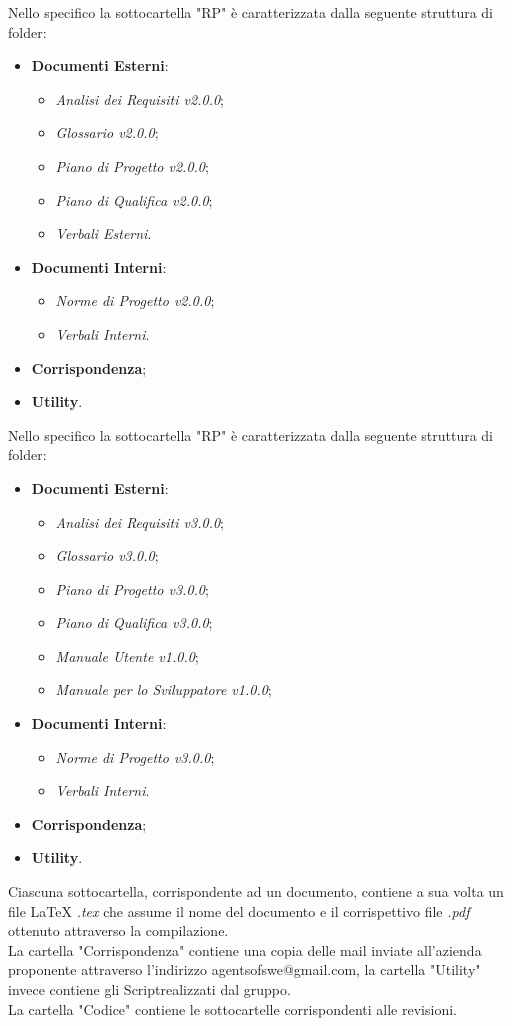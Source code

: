 	Nello specifico la sottocartella "RP" è caratterizzata dalla seguente struttura di folder:
	\begin{itemize}
	\item \textbf{Documenti Esterni}:
		\begin{itemize}
		\item \textit{Analisi dei Requisiti v2.0.0};
		\item \textit{Glossario v2.0.0};
		\item \textit{Piano di Progetto v2.0.0};
		\item \textit{Piano di Qualifica v2.0.0};
		\item \textit{Verbali Esterni}.
		\end{itemize}
	\item \textbf{Documenti Interni}:
		\begin{itemize}
		\item \textit{Norme di Progetto v2.0.0};
		\item \textit{Verbali Interni}.
		\end{itemize}
	\item \textbf{Corrispondenza};
	\item \textbf{Utility}.
	\end{itemize}
	Nello specifico la sottocartella "RP" è caratterizzata dalla seguente struttura di folder:
	\begin{itemize}
		\item \textbf{Documenti Esterni}:
		\begin{itemize}
			\item \textit{Analisi dei Requisiti v3.0.0};
			\item \textit{Glossario v3.0.0};
			\item \textit{Piano di Progetto v3.0.0};
			\item \textit{Piano di Qualifica v3.0.0};
			\item \textit{Manuale Utente v1.0.0};
			\item \textit{Manuale per lo Sviluppatore v1.0.0};
		\end{itemize}
		\item \textbf{Documenti Interni}:
		\begin{itemize}
			\item \textit{Norme di Progetto v3.0.0};
			\item \textit{Verbali Interni}.
		\end{itemize}
		\item \textbf{Corrispondenza};
		\item \textbf{Utility}.
	\end{itemize}
	Ciascuna sottocartella, corrispondente ad un documento, contiene a sua volta un file LaTeX \textit{.tex} che assume il nome del documento e il corrispettivo file \textit{.pdf} ottenuto attraverso la compilazione.\\
	La cartella "Corrispondenza" contiene una copia delle mail inviate all'azienda proponente attraverso l'indirizzo agentsofswe@gmail.com, la cartella "Utility" invece contiene gli Script\glossario realizzati dal gruppo.\\
	La cartella "Codice" contiene le sottocartelle corrispondenti alle revisioni.

